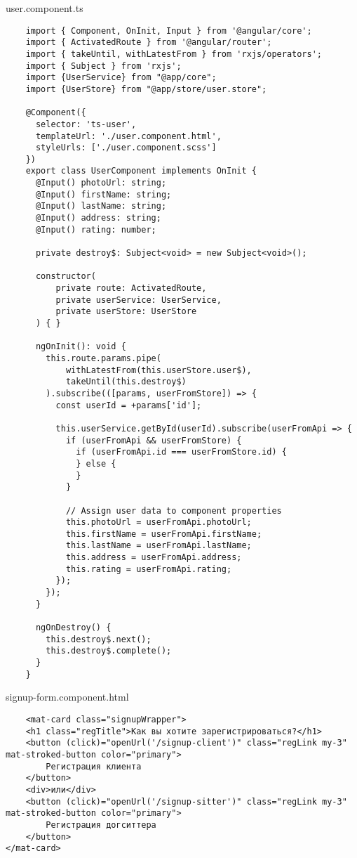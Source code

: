 user.component.ts
\begin{lstlisting}
    import { Component, OnInit, Input } from '@angular/core';
    import { ActivatedRoute } from '@angular/router';
    import { takeUntil, withLatestFrom } from 'rxjs/operators';
    import { Subject } from 'rxjs';
    import {UserService} from "@app/core";
    import {UserStore} from "@app/store/user.store";
    
    @Component({
      selector: 'ts-user',
      templateUrl: './user.component.html',
      styleUrls: ['./user.component.scss']
    })
    export class UserComponent implements OnInit {
      @Input() photoUrl: string;
      @Input() firstName: string;
      @Input() lastName: string;
      @Input() address: string;
      @Input() rating: number;
    
      private destroy$: Subject<void> = new Subject<void>();
    
      constructor(
          private route: ActivatedRoute,
          private userService: UserService,
          private userStore: UserStore
      ) { }
    
      ngOnInit(): void {
        this.route.params.pipe(
            withLatestFrom(this.userStore.user$),
            takeUntil(this.destroy$)
        ).subscribe(([params, userFromStore]) => {
          const userId = +params['id'];
    
          this.userService.getById(userId).subscribe(userFromApi => {
            if (userFromApi && userFromStore) {
              if (userFromApi.id === userFromStore.id) {
              } else {
              }
            }
    
            // Assign user data to component properties
            this.photoUrl = userFromApi.photoUrl;
            this.firstName = userFromApi.firstName;
            this.lastName = userFromApi.lastName;
            this.address = userFromApi.address;
            this.rating = userFromApi.rating;
          });
        });
      }
    
      ngOnDestroy() {
        this.destroy$.next();
        this.destroy$.complete();
      }
    }    
\end{lstlisting}

signup-form.component.html
\begin{lstlisting}
    <mat-card class="signupWrapper">
    <h1 class="regTitle">Как вы хотите зарегистрироваться?</h1>
    <button (click)="openUrl('/signup-client')" class="regLink my-3" mat-stroked-button color="primary">
        Регистрация клиента
    </button>
    <div>или</div>
    <button (click)="openUrl('/signup-sitter')" class="regLink my-3" mat-stroked-button color="primary">
        Регистрация догситтера
    </button>
</mat-card>
\end{lstlisting}

